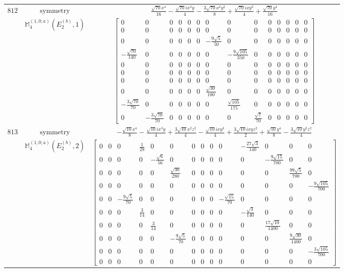 \documentclass[fleqn,8pt,landscape]{jsarticle}
\begin{document}
\begin{longtable}{ccc}
$ 812 $ & $ \text{symmetry} $ & $ \frac{\sqrt{70} x^{4}}{16} - \frac{\sqrt{70} i x^{3} y}{4} - \frac{3 \sqrt{70} x^{2} y^{2}}{8} + \frac{\sqrt{70} i x y^{3}}{4} + \frac{\sqrt{70} y^{4}}{16} $ \\
$  $ & $ \mathbb{M}_{4}^{(1,0;a)}(E_{2}^{(b)},1) $ & $ \begin{bmatrix} 0 & 0 & 0 & 0 & 0 & 0 & 0 & 0 & 0 & 0 & 0 & 0 & 0 & 0 \\ 0 & 0 & 0 & 0 & 0 & 0 & 0 & 0 & 0 & 0 & 0 & 0 & 0 & 0 \\ 0 & 0 & 0 & 0 & 0 & 0 & - \frac{9 \sqrt{5}}{50} & 0 & 0 & 0 & 0 & 0 & 0 & 0 \\ - \frac{\sqrt{70}}{140} & 0 & 0 & 0 & 0 & 0 & 0 & - \frac{9 \sqrt{105}}{350} & 0 & 0 & 0 & 0 & 0 & 0 \\ 0 & 0 & 0 & 0 & 0 & 0 & 0 & 0 & 0 & 0 & 0 & 0 & 0 & 0 \\ 0 & 0 & 0 & 0 & 0 & 0 & 0 & 0 & 0 & 0 & 0 & 0 & 0 & 0 \\ 0 & 0 & 0 & 0 & 0 & 0 & 0 & 0 & 0 & 0 & 0 & 0 & 0 & 0 \\ 0 & 0 & 0 & 0 & 0 & 0 & \frac{\sqrt{30}}{100} & 0 & 0 & 0 & 0 & 0 & 0 & 0 \\ - \frac{3 \sqrt{70}}{70} & 0 & 0 & 0 & 0 & 0 & 0 & \frac{\sqrt{105}}{175} & 0 & 0 & 0 & 0 & 0 & 0 \\ 0 & - \frac{3 \sqrt{70}}{70} & 0 & 0 & 0 & 0 & 0 & 0 & \frac{\sqrt{7}}{70} & 0 & 0 & 0 & 0 & 0 \end{bmatrix} $ \\ \hline
$ 813 $ & $ \text{symmetry} $ & $ - \frac{\sqrt{10} x^{4}}{8} - \frac{\sqrt{10} i x^{3} y}{4} + \frac{3 \sqrt{10} x^{2} z^{2}}{4} - \frac{\sqrt{10} i x y^{3}}{4} + \frac{3 \sqrt{10} i x y z^{2}}{2} + \frac{\sqrt{10} y^{4}}{8} - \frac{3 \sqrt{10} y^{2} z^{2}}{4} $ \\
$  $ & $ \mathbb{M}_{4}^{(1,0;a)}(E_{2}^{(b)},2) $ & $ \begin{bmatrix} 0 & 0 & 0 & \frac{1}{28} & 0 & 0 & 0 & 0 & 0 & 0 & - \frac{27 \sqrt{3}}{140} & 0 & 0 & 0 \\ 0 & 0 & 0 & 0 & - \frac{\sqrt{6}}{56} & 0 & 0 & 0 & 0 & 0 & 0 & - \frac{9 \sqrt{15}}{700} & 0 & 0 \\ 0 & 0 & 0 & 0 & 0 & \frac{\sqrt{30}}{280} & 0 & 0 & 0 & 0 & 0 & 0 & \frac{99 \sqrt{5}}{700} & 0 \\ 0 & 0 & 0 & 0 & 0 & 0 & 0 & 0 & 0 & 0 & 0 & 0 & 0 & - \frac{9 \sqrt{105}}{700} \\ 0 & 0 & - \frac{9 \sqrt{5}}{70} & 0 & 0 & 0 & 0 & 0 & 0 & - \frac{\sqrt{15}}{70} & 0 & 0 & 0 & 0 \\ 0 & 0 & 0 & \frac{3}{14} & 0 & 0 & 0 & 0 & 0 & 0 & - \frac{\sqrt{3}}{140} & 0 & 0 & 0 \\ 0 & 0 & 0 & 0 & \frac{3}{14} & 0 & 0 & 0 & 0 & 0 & 0 & \frac{17 \sqrt{10}}{1400} & 0 & 0 \\ 0 & 0 & 0 & 0 & 0 & - \frac{9 \sqrt{5}}{70} & 0 & 0 & 0 & 0 & 0 & 0 & \frac{9 \sqrt{30}}{1400} & 0 \\ 0 & 0 & 0 & 0 & 0 & 0 & 0 & 0 & 0 & 0 & 0 & 0 & 0 & - \frac{3 \sqrt{105}}{700} \\ 0 & 0 & 0 & 0 & 0 & 0 & 0 & 0 & 0 & 0 & 0 & 0 & 0 & 0 \end{bmatrix} $ \\ \hline

\end{longtable}
\end{document}
